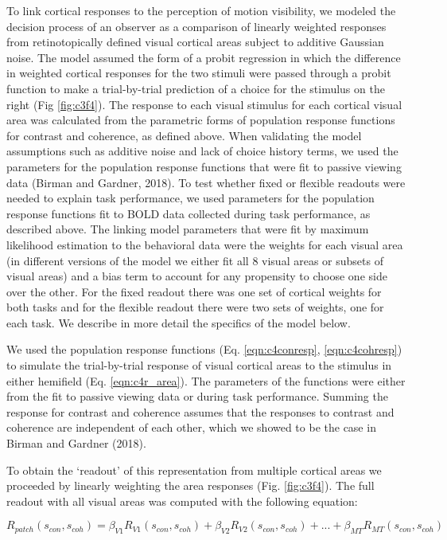 To link cortical responses to the perception of motion visibility, we modeled the decision process of an observer as a comparison of linearly weighted responses from retinotopically defined visual cortical areas subject to additive Gaussian noise. The model assumed the form of a probit regression in which the difference in weighted cortical responses for the two stimuli were passed through a probit function to make a trial-by-trial prediction of a choice for the stimulus on the right (Fig \ref{fig:c3f4}). The response to each visual stimulus for each cortical visual area was calculated from the parametric forms of population response functions for contrast and coherence, as defined above. When validating the model assumptions such as additive noise and lack of choice history terms, we used the parameters for the population response functions that were fit to passive viewing data (Birman and Gardner, 2018). To test whether fixed or flexible readouts were needed to explain task performance, we used parameters for the population response functions fit to BOLD data collected during task performance, as described above. The linking model parameters that were fit by maximum likelihood estimation to the behavioral data were the weights for each visual area (in different versions of the model we either fit all 8 visual areas or subsets of visual areas) and a bias term to account for any propensity to choose one side over the other. For the fixed readout there was one set of cortical weights for both tasks and for the flexible readout there were two sets of weights, one for each task. We describe in more detail the specifics of the model below.

We used the population response functions (Eq. \ref{eqn:c4conresp}, \ref{eqn:c4cohresp}) to simulate the trial-by-trial response of visual cortical areas to the stimulus in either hemifield (Eq. \ref{eqn:c4r_area}). The parameters of the functions were either from the fit to passive viewing data or during task performance. Summing the response for contrast and coherence assumes that the responses to contrast and coherence are independent of each other, which we showed to be the case in Birman and Gardner (2018).

To obtain the `readout' of this representation from multiple cortical areas we proceeded by linearly weighting the area responses (Fig. \ref{fig:c3f4}). The full readout with all visual areas was computed with the following equation:

\begin{equation}
    R_{patch}(s_{con},s_{coh})=\beta_{V1}R_{V1}(s_{con},s_{coh})+\beta_{V2}R_{V2}(s_{con},s_{coh})+...+\beta_{MT}R_{MT}(s_{con},s_{coh})
    \label{eqn:c4r_patch}
\end{equation}

